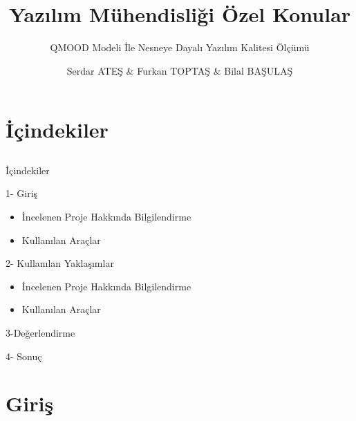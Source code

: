 \documentclass[compress,xcolor=table]{beamer}
\title{Yazılım Mühendisliği \newline Özel Konular  }
\subtitle{QMOOD Modeli İle Nesneye Dayalı Yazılım Kalitesi Ölçümü} %
\date{\formatdate{12}{01}{2021}}
\author{Serdar ATEŞ             \& Furkan TOPTAŞ     \&  Bilal BAŞULAŞ}
\institute{162805009               \& 162805008                \& 162805005} %
\begin{document}
\begin{frame}[plain]
\titlepage
\setcounter{framenumber}{0}
\end{frame}

\section{İçindekiler} \subsection{}

\begin{frame}{İçindekiler}

\begin{block}{1- Giriş}
		
\begin{itemize}
\item İncelenen Proje Hakkında Bilgilendirme
\item Kullanılan Araçlar
\end{itemize}
		
\end{block}
	
    \begin{block}{2- Kullanılan Yaklaşımlar}
		
\begin{itemize}
\item İncelenen Proje Hakkında Bilgilendirme
\item Kullanılan Araçlar
\end{itemize}
		
\end{block}
  \begin{block}{3-Değerlendirme}
		

		
\end{block}
  \begin{block}{4- Sonuç}
	

		
\end{block}

\end{frame}



\section{Giriş} \subsection{}
\end{document}
